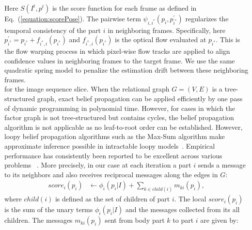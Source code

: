 \documentclass[10pt,twocolumn,letterpaper]{article}
\newcommand{\refequ}[1]{Eq.~(\ref{#1})}
\begin{document}
Here $S(I^t,p^t)$ is the score function for each frame as defined in \refequ{equation:scorePose}. The pairwise term $\psi_{i,i^{\ast}}(p_{i}, p^{\prime}_{i^{\ast}})$ regularizes the temporal consistency of the part $i$ in neighboring frames. Specifically, here $p^{\prime}_{i^{\ast}} =  p_{i^{\ast}}+f_{i^{\ast},i}(p_{i^{\ast}})$ and $f_{i^{\ast},i}(p_{i^{\ast}})$ is the optical flow evaluated at $p_{i^{\ast}}$. This is the flow warping process in which pixel-wise flow tracks  are applied to align confidence values in neighboring frames to the target frame. We use the same quadratic spring model to penalize the estimation drift between these neighboring frames.\\
for the image sequence slice.  When the relational graph $G = (V,E)$ is a tree-structured graph, exact belief propagation can be applied efficiently by one pass of dynamic programming in polynomial time. However, for cases in which the factor graph is not tree-structured but contains cycles, the belief propagation algorithm is not applicable as no leaf-to-root order can be established.
However, loopy belief propagation algorithms such as the Max-Sum algorithm make approximate inference
possible in intractable loopy models~\cite{NIPS1997_1467}. Empirical performance has consistently been reported to be excellent across various problems ~\cite{yang2016end,sigal2006measure}.
More precisely, in our case at each iteration a part $i$ sends a message to its neighbors and also receives reciprocal messages along the edges in $G$:
\begin{equation}
\begin{aligned}
score_i(p_i) &\leftarrow \phi_i(p_i|I)+\sum_{k\in child(i)}m_{ki}(p_i),
\end{aligned}
\label{equation:MP}
\end{equation}
where $child(i)$ is defined as the set of children of part $i$. The local $score_i(p_i)$ is the sum of the unary terms $\phi_i(p_i|I)$ and the messages collected from its all children. The messages $m_{ki}(p_i)$ sent from body part $k$ to part $i$ are given by:
\end{document}
